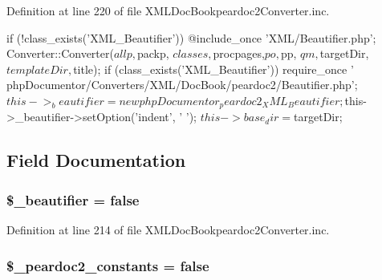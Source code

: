 \-Definition at line 220 of file \-X\-M\-L\-Doc\-Bookpeardoc2\-Converter.\-inc.


\begin{DoxyCode}
    {
        if (!class_exists('XML_Beautifier')) {
            @include_once 'XML/Beautifier.php';
        }
        Converter::Converter($allp, $packp, $classes, $procpages,$po, $pp, $qm,
       $targetDir, $templateDir, $title);
        if (class_exists('XML_Beautifier')) {
            require_once '
      phpDocumentor/Converters/XML/DocBook/peardoc2/Beautifier.php';
            $this->_beautifier = new phpDocumentor_peardoc2_XML_Beautifier;
            $this->_beautifier->setOption('indent', ' ');
        }
        $this->base_dir = $targetDir;
    }
\end{DoxyCode}


\subsection{\-Field \-Documentation}
\hypertarget{class_x_m_l_doc_bookpeardoc2_converter_a18b67ff3d47ad105041ee3956857fa14}{
\subsubsection[{\$\-\_\-beautifier}]{\setlength{\rightskip}{0pt plus 5cm}\$\-\_\-beautifier = false}}\label{class_x_m_l_doc_bookpeardoc2_converter_a18b67ff3d47ad105041ee3956857fa14}


\-Definition at line 214 of file \-X\-M\-L\-Doc\-Bookpeardoc2\-Converter.\-inc.

\hypertarget{class_x_m_l_doc_bookpeardoc2_converter_ac14cf395178914a75224ddfd9ae6de9f}{
\subsubsection[{\$\-\_\-peardoc2\-\_\-constants}]{\setlength{\rightskip}{0pt plus 5cm}\$\-\_\-peardoc2\-\_\-constants = false}}\label{class_x_m_l_doc_bookpeardoc2_converter_ac14cf395178914a75224ddfd9ae6de9f}



